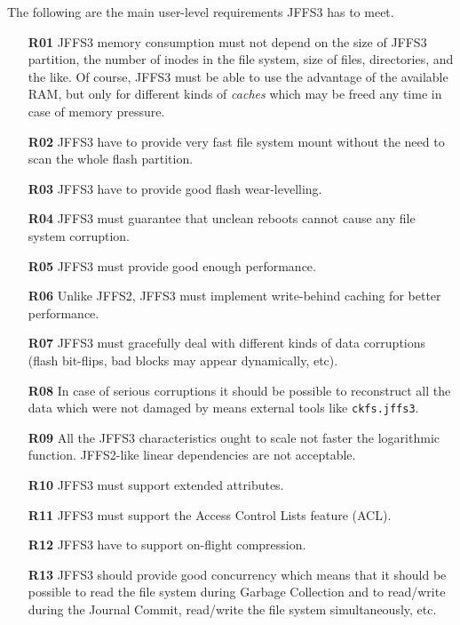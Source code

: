 %
%
%
%

The following are the main \mbox{user-level} requirements JFFS3 has to meet.

\begin{enumerate}

\item[\textbf{R01}]
JFFS3 memory consumption must not depend on the size of JFFS3
partition, the number of inodes in the file system, size of files,
directories, and the like. Of course, JFFS3 must be able to use the advantage
of the available RAM, but only for different kinds of \emph{caches}
which may be freed any time in case of memory pressure.

\item[\textbf{R02}] 
JFFS3 have to provide very fast file system mount without the need to scan the
whole flash partition.

\item[\textbf{R03}]
JFFS3 have to provide good flash \mbox{wear-levelling}.

\item[\textbf{R04}]
JFFS3 must guarantee that unclean reboots cannot cause any file system
corruption.

\item[\textbf{R05}]
JFFS3 must provide good enough performance.

\item[\textbf{R06}]
Unlike JFFS2, JFFS3 must implement \mbox{write-behind} caching for better
performance.

\item[\textbf{R07}]
JFFS3 must gracefully deal with different kinds of data corruptions (flash
\mbox{bit-flips}, bad blocks may appear dynamically, etc).

\item[\textbf{R08}]
In case of serious corruptions it should be possible to reconstruct all the
data which were not damaged by means external tools like \texttt{ckfs.jffs3}.

\item[\textbf{R09}] All the JFFS3 characteristics ought to scale not faster the
logarithmic function. \mbox{JFFS2-like} linear dependencies are not
acceptable. 

\item[\textbf{R10}]
JFFS3 must support extended attributes.

\item[\textbf{R11}]
JFFS3 must support the Access Control Lists feature (ACL).

\item[\textbf{R12}]
JFFS3 have to support \mbox{on-flight} compression.

\item[\textbf{R13}]
JFFS3 should provide good concurrency which means that it should be possible to
read the file system during Garbage Collection and to read/write during the
Journal Commit, read/write the file system simultaneously, etc.

\end{enumerate}

